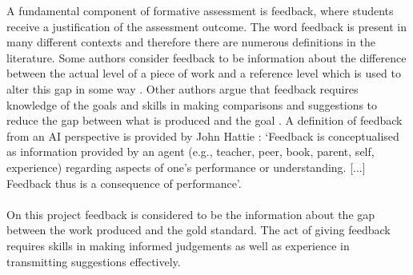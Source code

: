 \documentclass[11pt, oneside]{article}   	%
\begin{document}
A fundamental component of formative assessment is feedback, where students receive a justification of the assessment outcome. The word feedback is present in many different contexts and therefore there are numerous definitions in the literature. Some authors consider feedback to be information about the difference between the actual level of a piece of work and a reference level which is used to alter this gap in some way \cite{Ramaprasad}. Other authors argue that feedback requires knowledge of the goals and skills in making comparisons and suggestions to reduce the gap between what is produced and the goal \cite{Sadler1998}. A definition of feedback from an AI perspective is provided by John Hattie \cite{HattieHelenE-MailAddress2007}: `Feedback is conceptualised as information provided by an agent (e.g., teacher, peer, book, parent, self, experience) regarding aspects of one's performance or understanding. [...] Feedback thus is a consequence of performance'.\\\\
On this project feedback is considered to be the information about the gap between the work produced and the gold standard. %
The act of giving feedback requires skills in making informed judgements as well as experience in transmitting suggestions effectively.\\\\
\end{document}
